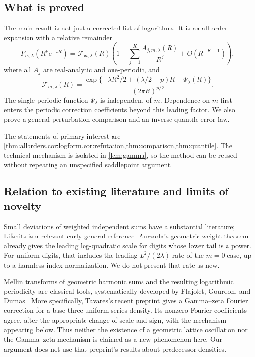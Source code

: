 \documentclass[11pt,a4paper]{article}
\numberwithin{equation}{section}
\theoremstyle{definition}
\newcommand{\ee}{\mathrm e}
\newcommand{\calF}{\mathcal F}
\begin{document}
\subsection{What is proved}
The main result is not just a corrected list of logarithms. It is an all-order expansion with a relative remainder:
\begin{equation}
 F_{m,\lambda}(R^p\ee^{-\lambda R})
 =\calF_{m,\lambda}(R)
 \left(1+\sum_{j=1}^K\frac{A_{j,m,\lambda}(R)}{R^j}
       +O(R^{-K-1})\right),
 \label{eq:intro-main}
\end{equation}
where all $A_j$ are real-analytic and one-periodic, and
\begin{equation}
 \calF_{m,\lambda}(R)
 =\frac{\exp\{-\lambda R^2/2+(\lambda/2+p)R-\Psi_\lambda(R)\}}
 {(2\pi R)^{p/2}}.
 \label{eq:leading}
\end{equation}
The single periodic function $\Psi_\lambda$ is independent of $m$. Dependence on $m$ first enters the periodic correction coefficients beyond this leading factor. We also prove a general perturbation comparison and an inverse-quantile error law.

The statements of primary interest are \cref{thm:allorders,cor:logform,cor:refutation,thm:comparison,thm:quantile}. The technical mechanism is isolated in \cref{lem:gamma}, so the method can be reused without repeating an unspecified saddlepoint argument.

\subsection{Relation to existing literature and limits of novelty}
Small deviations of weighted independent sums have a substantial literature; Lifshits \cite{lifshits} is a relevant early general reference. Aurzada's geometric-weight theorem \cite[Theorem 4]{aurzada} already gives the leading log-quadratic scale for digits whose lower tail is a power. For uniform digits, that includes the leading $L^2/(2\lambda)$ rate of the $m=0$ case, up to a harmless index normalization. We do not present that rate as new.

Mellin transforms of geometric harmonic sums and the resulting logarithmic periodicity are classical tools, systematically developed by Flajolet, Gourdon, and Dumas \cite{fgd}. More specifically, Tavares's recent preprint \cite[Proposition 6.3]{tavares} gives a Gamma--zeta Fourier correction for a base-three uniform-series density. Its nonzero Fourier coefficients agree, after the appropriate change of scale and sign, with the mechanism appearing below. Thus neither the existence of a geometric lattice oscillation nor the Gamma--zeta mechanism is claimed as a new phenomenon here. Our argument does not use that preprint's results about predecessor densities.
\end{document}
